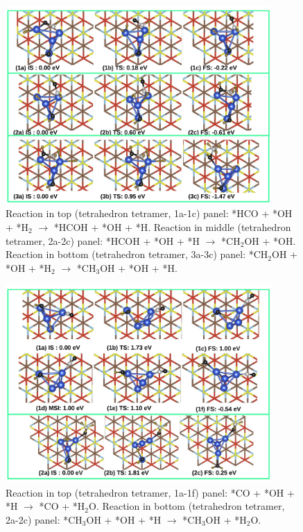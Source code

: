 \begin{figure}
  \begin{center}
    \includegraphics[width=0.9\textwidth]{./Appendix3/figures_si/p_119.jpg}
  \end{center}
    \caption{Reaction in top (tetrahedron tetramer, 1a-1c) panel: *HCO + *OH + *H$_2$ $\rightarrow$ *HCOH + *OH + *H. Reaction in middle (tetrahedron tetramer, 2a-2c) panel: *HCOH + *OH + *H $\rightarrow$ *CH$_2$OH + *OH. Reaction in bottom (tetrahedron tetramer, 3a-3c) panel: *CH$_2$OH + *OH + *H$_2$ $\rightarrow$ *CH$_3$OH + *OH + *H.  }
  \label{fig:si-118}
\end{figure}

\begin{figure}
  \begin{center}
    \includegraphics[width=0.9\textwidth]{./Appendix3/figures_si/p_120.jpg}
  \end{center}
    \caption{ Reaction in top (tetrahedron tetramer, 1a-1f) panel: *CO + *OH + *H $\rightarrow$ *CO + *H$_2$O. Reaction in bottom (tetrahedron tetramer, 2a-2c) panel: *CH$_3$OH + *OH + *H $\rightarrow$ *CH$_3$OH + *H$_2$O.  }
  \label{fig:si-119}
\end{figure}

